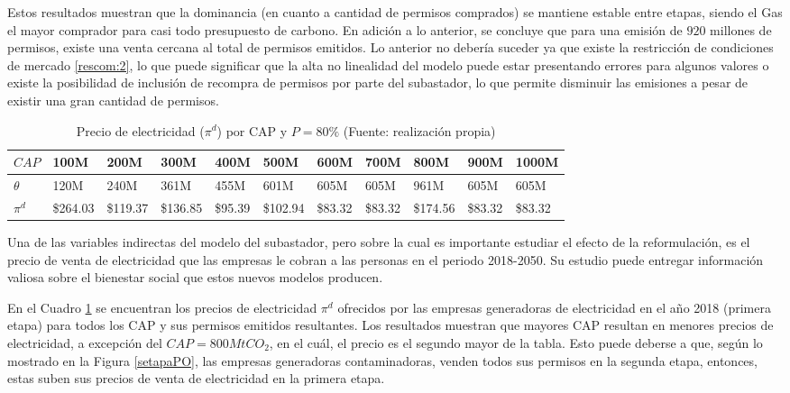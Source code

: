Estos resultados muestran que la dominancia (en cuanto a cantidad de permisos comprados) se mantiene estable entre etapas, siendo el Gas el mayor comprador para casi todo presupuesto de carbono. En adición a lo anterior, se concluye que para una emisión de $920$ millones de permisos, existe una venta cercana al total de permisos emitidos. Lo anterior no debería suceder ya que existe la restricción de condiciones de mercado \ref{rescom:2}, lo que puede significar que la alta no linealidad del modelo puede estar presentando errores para algunos valores o existe la posibilidad de inclusión de recompra de permisos por parte del subastador, lo que permite disminuir las emisiones a pesar de existir una gran cantidad de permisos.
\vspace{2.5mm}

\begin{table}[H]
\begin{footnotesize}
    \centering
    \begin{tabular}{|l|l|l|l|l|l|l|l|l|l|l|}
    \hline
        $CAP$ & 100M & 200M & 300M & 400M & 500M & 600M & 700M & 800M & 900M & 1000M \\ \hline
        $\theta$  & 120M & 240M & 361M & 455M & 601M & 605M & 605M & 961M & 605M & 605M \\ \hline
        $\pi^d$  &  \$264.03   &  \$119.37   &  \$136.85   &  \$95.39   &  \$102.94   &  \$83.32   &  \$83.32   &  \$174.56   &  \$83.32   &  \$83.32   \\ \hline
    \end{tabular}
    \caption{{\footnotesize Precio de electricidad ($\pi^d$) por CAP y $P=80\%$ (Fuente: realización propia)}}
    \label{POpidporcap}
\end{footnotesize}
\end{table}

Una de las variables indirectas del modelo del subastador, pero sobre la cual es importante estudiar el efecto de la reformulación, es el precio de venta de electricidad que las empresas le cobran a las personas en el periodo 2018-2050. Su estudio puede entregar información valiosa sobre el bienestar social que estos nuevos modelos producen.
\vspace{2.5mm}

En el Cuadro \ref{POpidporcap} se encuentran los precios de electricidad $\pi^d$ ofrecidos por las empresas generadoras de electricidad en el año 2018 (primera etapa) para todos los CAP y sus permisos emitidos resultantes. Los resultados muestran que mayores CAP resultan en menores precios de electricidad, a excepción del $CAP= 800MtCO_2$, en el cuál, el precio es el segundo mayor de la tabla. Esto puede deberse a que, según lo mostrado en la Figura \ref{setapaPO}, las empresas generadoras contaminadoras, venden todos sus permisos en la segunda etapa, entonces, estas suben sus precios de venta de electricidad en la primera etapa.
\vspace{2.5mm}

